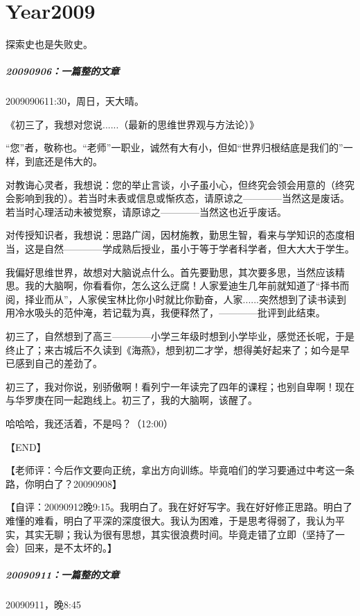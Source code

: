 \documentclass[UTF8]{book}
\begin{document}
\chapter{Year2009}

探索史也是失败史。

\paragraph{20090906：一篇整的文章}
2009090611:30，周日，天大晴。

《初三了，我想对您说......（最新的思维世界观与方法论）》

“您”者，敬称也。“老师”一职业，诚然有大有小，但如“世界归根结底是我们的”一样，到底还是伟大的。

对教诲心灵者，我想说：您的举止言谈，小子虽小心，但终究会领会用意的（终究会影响到我的）。若当时未表或信息或惭疚态，请原谅之————当然这是废话。若当时心理活动未被觉察，请原谅之————当然这也近乎废话。

对传授知识者，我想说：思路广阔，因材施教，勤思生智，看来与学知识的态度相当，这是自然————学成熟后授业，虽小于等于学者科学者，但大大大于学生。

我偏好思维世界，故想对大脑说点什么。首先要勤思，其次要多思，当然应该精思。我的大脑啊，你看看你，怎么这么迂腐！人家爱迪生几年前就知道了“择书而阅，择业而从”，人家侯宝林比你小时就比你勤奋，人家......突然想到了读书读到用冷水吸头的范仲淹，若记载为真，我便释然了，————批评到此结束。

初三了，自然想到了高三————小学三年级时想到小学毕业，感觉还长呢，于是终止了；来古城后不久读到《海燕》，想到初二才学，想得美好起来了；如今是早已感到自己的差劲了。

初三了，我对你说，别骄傲啊！看列宁一年读完了四年的课程；也别自卑啊！现在与华罗庚在同一起跑线上。初三了，我的大脑啊，该醒了。

哈哈哈，我还活着，不是吗？（12:00）

【END】

【老师评：今后作文要向正统，拿出方向训练。毕竟咱们的学习要通过中考这一条路，你明白了？20090908】

【自评：20090912晚9:15。我明白了。我在好好写字。我在好好修正思路。明白了难懂的难看，明白了平深的深度很大。我认为困难，于是思考得弱了，我认为平实，其实无聊；我认为很有思想，其实很浪费时间。毕竟走错了立即（坚持了一会）回来，是不太坏的。】


\paragraph{20090911：一篇整的文章}
20090911，晚8:45
\end{document}
